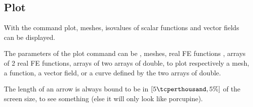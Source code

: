 \documentclass[a4paper,twoside,12pt]{book}
\begin{document}
\subsection{Plot} \label{sec:Plot}
   With the command plot, meshes, isovalues of scalar functions and vector fields can be displayed.

The parameters of the plot command can be , meshes, real FE functions ,
arrays of 2  real FE functions, arrays of two arrays of double, to plot
respectively a mesh, a function, a vector field, or a curve defined by the two arrays of double.
\begin{note}
The length of an arrow is always  bound to be in  $[5\tcperthousand, 5\%]$ of the screen size, to see something (else it will only look like porcupine). %
\end{note}
\end{document}
